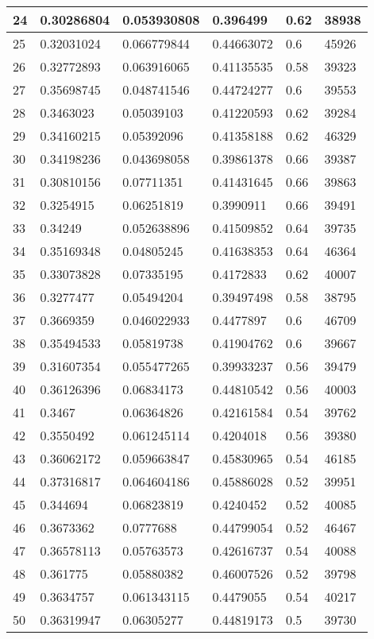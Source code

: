 \begin{longtable}{|l|l|l|l|l|l|}
24 & 0.30286804 & 0.053930808 & 0.396499 & 0.62 & 38938 \\ \hline 
25 & 0.32031024 & 0.066779844 & 0.44663072 & 0.6 & 45926 \\ \hline 
26 & 0.32772893 & 0.063916065 & 0.41135535 & 0.58 & 39323 \\ \hline 
27 & 0.35698745 & 0.048741546 & 0.44724277 & 0.6 & 39553 \\ \hline 
28 & 0.3463023 & 0.05039103 & 0.41220593 & 0.62 & 39284 \\ \hline 
29 & 0.34160215 & 0.05392096 & 0.41358188 & 0.62 & 46329 \\ \hline 
30 & 0.34198236 & 0.043698058 & 0.39861378 & 0.66 & 39387 \\ \hline 
31 & 0.30810156 & 0.07711351 & 0.41431645 & 0.66 & 39863 \\ \hline 
32 & 0.3254915 & 0.06251819 & 0.3990911 & 0.66 & 39491 \\ \hline 
33 & 0.34249 & 0.052638896 & 0.41509852 & 0.64 & 39735 \\ \hline 
34 & 0.35169348 & 0.04805245 & 0.41638353 & 0.64 & 46364 \\ \hline 
35 & 0.33073828 & 0.07335195 & 0.4172833 & 0.62 & 40007 \\ \hline 
36 & 0.3277477 & 0.05494204 & 0.39497498 & 0.58 & 38795 \\ \hline 
37 & 0.3669359 & 0.046022933 & 0.4477897 & 0.6 & 46709 \\ \hline 
38 & 0.35494533 & 0.05819738 & 0.41904762 & 0.6 & 39667 \\ \hline 
39 & 0.31607354 & 0.055477265 & 0.39933237 & 0.56 & 39479 \\ \hline 
40 & 0.36126396 & 0.06834173 & 0.44810542 & 0.56 & 40003 \\ \hline 
41 & 0.3467 & 0.06364826 & 0.42161584 & 0.54 & 39762 \\ \hline 
42 & 0.3550492 & 0.061245114 & 0.4204018 & 0.56 & 39380 \\ \hline 
43 & 0.36062172 & 0.059663847 & 0.45830965 & 0.54 & 46185 \\ \hline 
44 & 0.37316817 & 0.064604186 & 0.45886028 & 0.52 & 39951 \\ \hline 
45 & 0.344694 & 0.06823819 & 0.4240452 & 0.52 & 40085 \\ \hline 
46 & 0.3673362 & 0.0777688 & 0.44799054 & 0.52 & 46467 \\ \hline 
47 & 0.36578113 & 0.05763573 & 0.42616737 & 0.54 & 40088 \\ \hline 
48 & 0.361775 & 0.05880382 & 0.46007526 & 0.52 & 39798 \\ \hline 
49 & 0.3634757 & 0.061343115 & 0.4479055 & 0.54 & 40217 \\ \hline 
50 & 0.36319947 & 0.06305277 & 0.44819173 & 0.5 & 39730 \\ \hline 
\end{longtable}